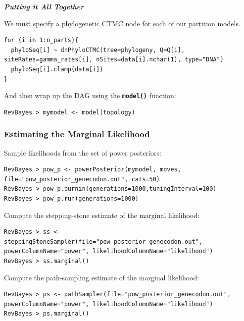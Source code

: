\documentclass[11pt]{article}
\newcommand{\cl}[1]{{\texttt{\textbf{#1}}}}
\begin{document}
\textbf{\textit{Putting it All Together}}

We must specify a phylogenetic CTMC node for each of our partition models.
{\tt \begin{snugshade*}
\begin{lstlisting}
for (i in 1:n_parts){
  phyloSeq[i] ~ dnPhyloCTMC(tree=phylogeny, Q=Q[i], siteRates=gamma_rates[i], nSites=data[i].nchar(1), type="DNA")
  phyloSeq[i].clamp(data[i])
}
\end{lstlisting}
\end{snugshade*}}


And then wrap up the DAG using the \cl{model()} function:
{\tt \begin{snugshade*}
\begin{lstlisting}
RevBayes > mymodel <- model(topology)
\end{lstlisting}
\end{snugshade*}}


\subsubsection*{Estimating the Marginal Likelihood}

Sample likelihoods from the set of power posteriors:
{\tt \begin{snugshade*}
\begin{lstlisting}
RevBayes > pow_p <- powerPosterior(mymodel, moves, file="pow_posterior_genecodon.out", cats=50) 
RevBayes > pow_p.burnin(generations=1000,tuningInterval=100)
RevBayes > pow_p.run(generations=1000)  
\end{lstlisting}
\end{snugshade*}}

Compute the stepping-stone estimate of the marginal likelihood:
{\tt \begin{snugshade*}
\begin{lstlisting}
RevBayes > ss <- steppingStoneSampler(file="pow_posterior_genecodon.out", powerColumnName="power", likelihoodColumnName="likelihood")
RevBayes > ss.marginal() 
\end{lstlisting}
\end{snugshade*}}

Compute the path-sampling estimate of the marginal likelihood:
{\tt \begin{snugshade*}
\begin{lstlisting}
RevBayes > ps <- pathSampler(file="pow_posterior_genecodon.out", powerColumnName="power", likelihoodColumnName="likelihood")
RevBayes > ps.marginal() 
\end{lstlisting}
\end{snugshade*}}
\end{document}
